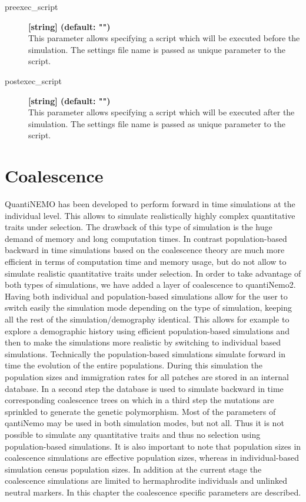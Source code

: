 \documentclass[letterpaper,12pt,oneside]{book}
\begin{document}
\begin{description}
\item[preexec\_script] \textbf{[string] (default: "")}\\
This parameter allows specifying a script which will be executed before the simulation. The settings file name is passed as unique parameter to the script.

\item[postexec\_script] \textbf{[string] (default: "")}\\
This parameter allows specifying a script which will be executed after the simulation. The settings file name is passed as unique parameter to the script.
\end{description}

\newpage
\chapter{Coalescence}\label{coalescence}
QuantiNEMO has been developed to perform forward in time simulations at the individual level. This allows to simulate realistically highly complex quantitative traits under selection. The drawback of this type of simulation is the huge demand of memory and long computation times. In contrast population-based backward in time simulations based on the coalescence theory are much more efficient in terms of computation time and memory usage, but do not allow to simulate realistic quantitative traits under selection. In order to take advantage of both types of simulations, we have added a layer of coalescence to quantiNemo2. Having both individual and population-based simulations allow for the user to switch easily the simulation mode depending on the type of simulation, keeping all the rest of the simulation/demography identical. This allows for example to explore a demographic history using efficient population-based simulations and then to make the simulations more realistic by switching to individual based simulations. Technically the population-based simulations simulate forward in time the evolution of the entire populations. During this simulation the population sizes and immigration rates for all patches are stored in an internal database. In a second step the database is used to simulate backward in time corresponding coalescence trees on which in a third step the mutations are sprinkled to generate the genetic polymorphism.
Most of the parameters of qantiNemo may be used in both simulation modes, but not all. Thus it is not possible to simulate any quantitative traits and thus no selection using population-based simulations. It is also important to note that population sizes in coalescence simulations are effective population sizes, whereas in individual-based simulation census population sizes. In addition at the current stage the coalescence simulations are limited to hermaphrodite individuals and unlinked neutral markers. In this chapter the coalescence specific parameters are described.
\end{document}
